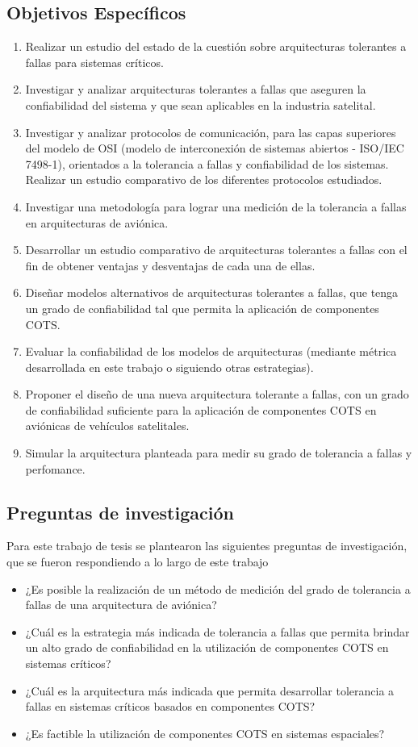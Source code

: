\subsection{Objetivos Específicos}
\begin{enumerate}
 \item Realizar un estudio del estado de la cuestión sobre arquitecturas tolerantes a fallas para 
sistemas críticos.
 \item Investigar y analizar arquitecturas tolerantes a fallas que aseguren la confiabilidad del 
sistema y que sean aplicables en la industria satelital.
 \item Investigar y analizar protocolos de comunicación, para las capas superiores del modelo de 
OSI (modelo de interconexión de sistemas abiertos - ISO/IEC 7498-1), orientados a la tolerancia a 
fallas y confiabilidad de los sistemas. Realizar un estudio comparativo de los diferentes 
protocolos estudiados.
 \item Investigar una metodología para lograr una medición de la tolerancia a fallas en 
arquitecturas de aviónica.
 \item Desarrollar un estudio comparativo de arquitecturas tolerantes a fallas con el fin de obtener 
ventajas y desventajas de cada una de ellas.
 \item Diseñar modelos alternativos de arquitecturas tolerantes a fallas, que tenga un grado de 
confiabilidad tal que permita la aplicación de componentes \ac{COTS}.
 \item Evaluar la confiabilidad de los modelos de arquitecturas (mediante métrica desarrollada en 
este trabajo o siguiendo otras estrategias). 
 \item Proponer el diseño de una nueva arquitectura tolerante a fallas, con un 
grado de confiabilidad suficiente para la aplicación de componentes \ac{COTS} en aviónicas de vehículos 
satelitales.
\item Simular la arquitectura planteada para medir su grado de tolerancia a fallas y perfomance.
\end{enumerate}

\subsection{Preguntas de investigación}
Para este trabajo de tesis se plantearon las siguientes preguntas de investigación, que se fueron respondiendo a lo largo de este trabajo\:
\begin{itemize}
 \item ¿Es posible la realización de un método de medición del grado de tolerancia a fallas de una arquitectura de aviónica?
 \item ¿Cuál es la estrategia más indicada de tolerancia a fallas que permita brindar un alto grado de confiabilidad en la utilización de componentes
 \ac{COTS} en sistemas críticos?
 \item ¿Cuál es la arquitectura más indicada que permita desarrollar tolerancia a fallas en sistemas críticos basados en componentes \ac{COTS}?
 \item ¿Es factible la utilización de componentes \ac{COTS} en sistemas espaciales?
\end{itemize}
